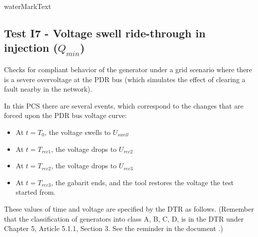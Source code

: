     {{ waterMarkText }}

    \renewcommand{\DTRPcs}{GridVoltageSwell} %
    \renewcommand{\PCSname}{PCS_RTE-I16z3}
    \renewcommand{\OCname}{QMinInjection}


    \subsection{Test I7 - Voltage swell ride-through in injection ($Q_{min}$)}

    Checks for compliant behavior of the generator under a grid scenario where
    there is a severe overvoltage at the PDR bus (which simulates the
    effect of clearing a fault nearby in the network).

    \GridCircuitZthree

    In this PCS there are several events, which correspond to the changes that are
    forced upon the PDR bus voltage curve:
    \begin{itemize}
        \item At $t = T_{0}$, the voltage swells to $U_{swell}$
        \item At $t = T_{rec1}$, the voltage drops to $U_{rec2}$
        \item At $t = T_{rec2}$, the voltage drops to $U_{rec3}$
        \item At $t = T_{rec3}$, the gabarit ends, and the tool restores the
        voltage the test started from.
    \end{itemize}
    These values of time and voltage are specified by the DTR as follows. (Remember
    that the classification of generators into class A, B, C, D, is in the DTR under
    Chapter 5, Article 5.1.1, Section 3. See the reminder in the document
    .)

